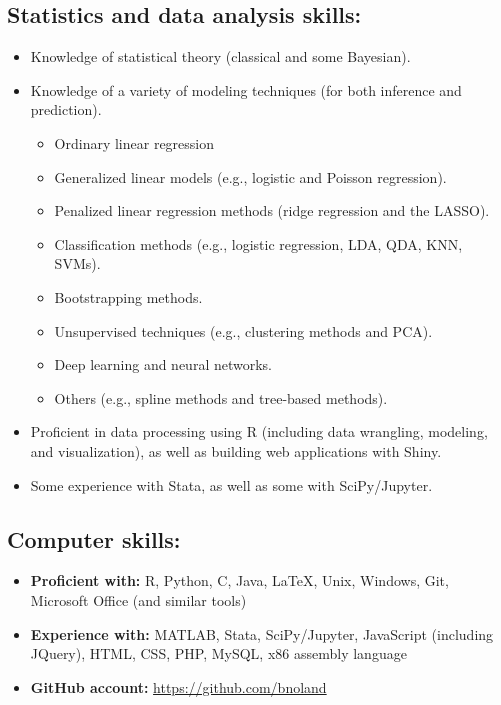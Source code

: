 \documentclass[letterpaper,12pt]{article}
\begin{document}
\subsection*{Statistics and data analysis skills:}
\begin{itemize}
\item
Knowledge of statistical theory (classical and some Bayesian).
\item
Knowledge of a variety of modeling techniques (for both inference and prediction).
\begin{itemize}
\item
Ordinary linear regression
\item
Generalized linear models (e.g., logistic and Poisson regression).
\item
Penalized linear regression methods (ridge regression and the LASSO).
\item
Classification methods (e.g., logistic regression, LDA, QDA, KNN, SVMs).
\item
Bootstrapping methods.
\item
Unsupervised techniques (e.g., clustering methods and PCA).
\item
Deep learning and neural networks.
\item
Others (e.g., spline methods and tree-based methods).
\end{itemize}
\item
Proficient in data processing using R (including data wrangling, modeling, and visualization), as 
well as building web applications with Shiny.
\item
Some experience with Stata, as well as some with SciPy/Jupyter.
\end{itemize}

\subsection*{Computer skills:}
\begin{itemize}
\item
\textbf{Proficient with:} R, Python, C, Java, \LaTeX, Unix, Windows, Git, Microsoft Office (and 
similar tools)
\item
\textbf{Experience with:} MATLAB, Stata, SciPy/Jupyter, JavaScript (including JQuery), HTML, CSS, PHP, 
MySQL, x86 assembly language
\item
\textbf{GitHub account:} \url{https://github.com/bnoland}
\end{itemize}
\end{document}
